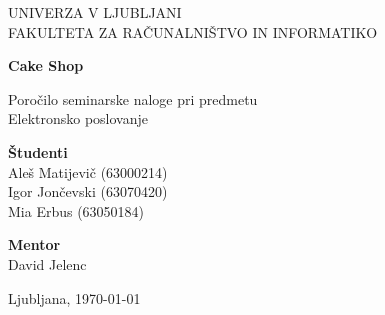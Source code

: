 \documentclass[a4paper,12pt]{report}
\newcommand{\naslov}     {Cake Shop}
\newcommand{\prviavtor}  {Aleš Matijevič}
\newcommand{\prviindeks} {63000214}
\newcommand{\drugiavtor} {Igor Jončevski}
\newcommand{\drugiindeks}{63070420}
\newcommand{\tretjiavtor}{Mia Erbus}
\newcommand{\tretjiindeks}{63050184}
\newcommand{\kraj}       {Ljubljana}
\begin{document}
\begin{titlepage}
	\begin{center}
	{UNIVERZA V LJUBLJANI\\[10pt] 
	FAKULTETA ZA RAČUNALNIŠTVO IN INFORMATIKO}

	\vspace{65mm}

	{\Large\textbf{\naslov}}

	\vspace{10mm}

	{\large Poročilo seminarske naloge pri predmetu\\[10pt] Elektronsko poslovanje}

	\vfill
	\vspace{60mm}

\hspace{20mm}
\begin{minipage}[t]{70mm}
	{\bf Študenti}\\
	{\prviavtor} ({\prviindeks})\\ 
	{\drugiavtor} ({\drugiindeks})\\
	{\tretjiavtor} ({\tretjiindeks})
\end{minipage}
\begin{minipage}[t]{50mm}
	{\bf Mentor}\\
	David Jelenc
\end{minipage}

	\vspace{40mm}

	{	\kraj, \today}
	\end{center}
\end{titlepage}


\tableofcontents
\begin{abstract}
Pri predmetu Elektronsko poslovanje smo morali kot seminarsko nalogo izdelati spletno prodajalno. Ker smo za osnovo izbrali CakePHP ogrodje za izdelavo spletnih aplikacij, smo tudi spletno prodajalno poimenovali cakeshop. CakeShop je torej ime naše spletne prodajalne in dejansko predstavlja prodajalno slaščic oz. različnih tort. Podatke in slike o tortah smo na avtomatiziran način pridobili iz različnih internetnih virov, v večini pa iz Wikipedije. Skratka izdelali smo aplikacijo za prodajo tort. 
\end{abstract}
\end{document}
